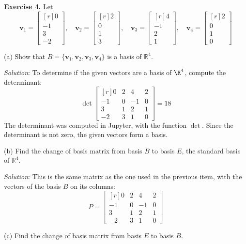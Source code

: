 \documentclass[12pt]{article}
\begin{document}
\bigskip
\textbf{Exercise 4.} Let
\[
\mathbf{v}_1=\left[\begin{matrix*}[r]0\\-1\\3\\-2\end{matrix*}\right],\quad
\mathbf{v}_2=\left[\begin{matrix*}[r]2\\0\\1\\3\end{matrix*}\right],\quad
\mathbf{v}_3=\left[\begin{matrix*}[r]4\\-1\\2\\1\end{matrix*}\right],\quad
\mathbf{v}_4=\left[\begin{matrix*}[r]2\\0\\1\\0\end{matrix*}\right]
\]

\medskip
(a) Show that $B=\{\mathbf{v}_1,\mathbf{v}_2,\mathbf{v}_3,\mathbf{v}_4\}$ is a basis of $\mathbb{R}^4$.

\emph{Solution}: To determine if the given vectors are a basis of $\R^4$, compute the determinant:
\[
\det\left[\begin{matrix*}[r]0 & 2 & 4 & 2\\-1 & 0 & -1 & 0\\3 & 1 & 2 & 1\\-2 & 3 & 1 & 0\end{matrix*}\right]=18
\]
The determinant was computed in Jupyter, with the function $\det$. Since the determinant is not zero, the given vectors form a basis.
\proofend

\medskip
(b) Find the change of basis matrix from basis $B$ to basis $E$, the standard basis of $\mathbb{R}^4$.

\emph{Solution}: This is the same matrix as the one used in the previous item, with the vectors of the basis $B$ on its columns:
\[
P=\left[\begin{matrix*}[r]0 & 2 & 4 & 2\\-1 & 0 & -1 & 0\\3 & 1 & 2 & 1\\-2 & 3 & 1 & 0\end{matrix*}\right]
\] 
\proofend

\medskip
(c) Find the change of basis matrix from basis $E$ to basis $B$.
\end{document}
